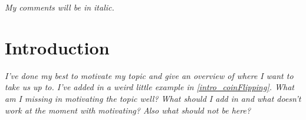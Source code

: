 \documentclass[12pt, a4paper, twoside]{article}
\begin{document}

\tableofcontents

\vfill
\pagebreak

{\em My comments will be in italic.}

\section{Introduction}\label{intro}
{\em I've done my best to motivate my topic and give an overview of where I want
to take us up to.
I've added in a weird little example in \ref{intro_coinFlipping}.
What am I missing in motivating the topic well?
What should I add in and what doesn't work at the moment with motivating?
Also what should not be here?}
\end{document}
